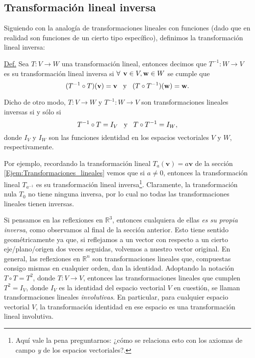 \documentclass[12pt]{article}
\begin{document}
\subsection{Transformación lineal inversa}

Siguiendo con la analogía de transformaciones lineales con funciones (dado que en realidad son funciones de un cierto tipo específico), definimos la transformación lineal inversa:

\begin{tcolorbox}
\underline{Def.} Sea $T:V\to W$ una transformación lineal, entonces decimos que $T^{-1}:W\to V$ es su transformación lineal inversa si $\forall\hspace{1.5mm} \mathbf{v}\in V, \mathbf{w}\in W$ se cumple que \[(T^{-1}\circ T)(\mathbf{v})=\mathbf{v}\hspace{3mm} \text{y} \hspace{3mm} (T\circ T^{-1})(\mathbf{w})=\mathbf{w}.\]

Dicho de otro modo, $T:V\to W$ y $T^{-1}:W\to V$ son transformaciones lineales inversas si y sólo si \[T^{-1}\circ T=I_V \hspace{3mm} \text{y} \hspace{3mm} T\circ T^{-1}=I_W,\] \noindent donde $I_V$ y $I_W$ son las funciones identidad en los espacios vectoriales $V$ y $W$, respectivamente.

\end{tcolorbox}{}

Por ejemplo, recordando  la transformación lineal $T_a(\mathbf{v})=a\mathbf{v}$ de la sección \ref{Ejem:Transformaciones_lineales} vemos que si $a\neq 0$, entonces la transformación lineal $T_{a^{-1}}$ es su transformación lineal inversa\footnote{Aquí vale la pena preguntarnos: ¿cómo se relaciona esto con los axiomas de campo \emph{y} de los espacios vectoriales?.}. Claramente, la transformación nula $T_0$ no tiene ninguna inversa, por lo cual no todas las transformaciones lineales tienen inversas. 

Si pensamos en las reflexiones en $\mathbb{R}^3$, entonces cualquiera de ellas \emph{es su propia inversa}, como observamos al final de la sección anterior. Esto tiene sentido geométricamente ya que, si reflejamos a un vector con respecto a un cierto eje/plano/origen dos veces seguidas, volvemos a nuestro vector original. En general, las reflexiones en $\mathbb{R}^n$ son transformaciones lineales que, compuestas consigo mismas en cualquier orden, dan la identidad. Adoptando la notación $T\circ T=T^2$, donde $T:V\to V$, entonces las transformaciones lineales que cumplen $T^2=I_V$, donde $I_V$ es la identidad del espacio vectorial $V$ en cuestión, se llaman transformaciones lineales \emph{involutivas}. En particular, para cualquier espacio vectorial $V$, la transformación identidad en ese espacio es una transformación lineal involutiva.
\end{document}
